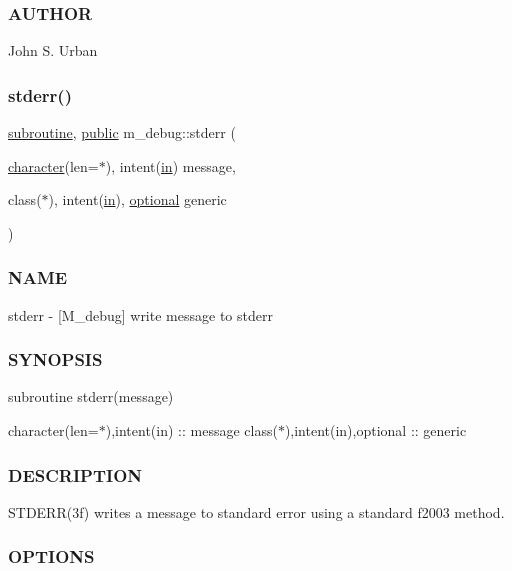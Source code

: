 \subsubsection*{A\+U\+T\+H\+OR}

John S. Urban \mbox{\label{namespacem__debug_ad59ade4de861dcf4e007521b2cf2f304}} 
\subsubsection{\texorpdfstring{stderr()}{stderr()}}
{\footnotesize\ttfamily \hyperlink{M__stopwatch_83_8txt_acfbcff50169d691ff02d4a123ed70482}{subroutine}, \hyperlink{M__stopwatch_83_8txt_a2f74811300c361e53b430611a7d1769f}{public} m\+\_\+debug\+::stderr (\begin{DoxyParamCaption}\item[{\hyperlink{option__stopwatch_83_8txt_abd4b21fbbd175834027b5224bfe97e66}{character}(len=$\ast$), intent(\hyperlink{M__journal_83_8txt_afce72651d1eed785a2132bee863b2f38}{in})}]{message,  }\item[{class($\ast$), intent(\hyperlink{M__journal_83_8txt_afce72651d1eed785a2132bee863b2f38}{in}), \hyperlink{option__stopwatch_83_8txt_aa4ece75e7acf58a4843f70fe18c3ade5}{optional}}]{generic }\end{DoxyParamCaption})}



\subsubsection*{N\+A\+ME}

stderr -\/ \mbox{[}M\+\_\+debug\mbox{]} write message to stderr \subsubsection*{S\+Y\+N\+O\+P\+S\+IS}

subroutine stderr(message)

character(len=$\ast$),intent(in) \+:\+: message class($\ast$),intent(in),optional \+:\+: generic \subsubsection*{D\+E\+S\+C\+R\+I\+P\+T\+I\+ON}

S\+T\+D\+E\+R\+R(3f) writes a message to standard error using a standard f2003 method. \subsubsection*{O\+P\+T\+I\+O\+NS}

